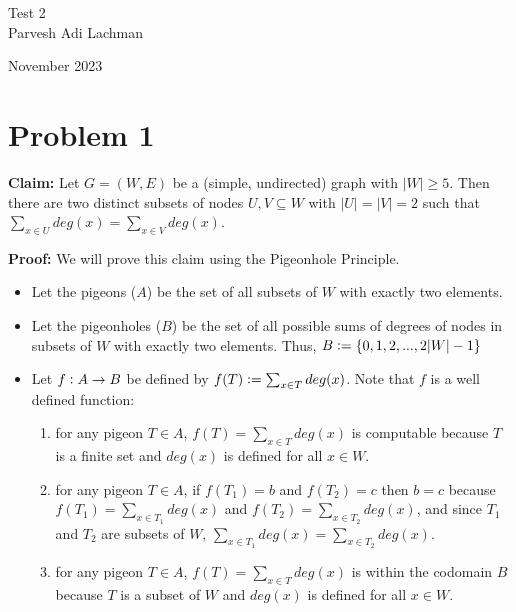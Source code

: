 \documentclass{article}
\begin{document}
\begingroup  
  \centering
  \LARGE Test 2\\[1.25em]
  \large Parvesh Adi Lachman\par\vspace{5pt}
  \large November 2023\par
\endgroup


\section{Problem 1}
\noindent\textbf{Claim:} Let $G=(W,E)$ be a (simple, undirected) graph with $|W|\geq 5$. Then there are two distinct subsets of nodes $U,V\subseteq W$ with $|U| = |V| =2$ such that $\sum_{x\in U} deg(x)=\sum_{x\in V} deg(x)$.\vspace{15pt}

\noindent\textbf{Proof:} We will prove this claim using the Pigeonhole Principle. 

\begin{itemize}
	\item Let the pigeons ($A$) be the set of all subsets of $W$ with exactly two elements.
	\item Let the pigeonholes ($B$) be the set of all possible sums of degrees of nodes in subsets of $W$ with exactly two elements. Thus, $B\vcentcolon =\{0,1,2,...,2|W|-1\}$
	\item Let $f\vcentcolon A\rightarrow B$ be defined by $f(T)\vcentcolon =\sum_{x\in T} deg(x)$. Note that $f$ is a well defined function:
		\begin{enumerate}[(1)]
			\item for any pigeon $T\in A$, $f(T)=\sum_{x\in T} deg(x)$ is computable because $T$ is a finite set and $deg(x)$ is defined for all $x\in W$.
			\item for any pigeon $T\in A$, if $f(T_1)=b$ and $f(T_2)=c$ then $b=c$ because $f(T_1)=\sum_{x\in T_1} deg(x)$ and $f(T_2)=\sum_{x\in T_2} deg(x)$, and since $T_1$ and $T_2$ are subsets of $W$, $\sum_{x\in T_1} deg(x)=\sum_{x\in T_2} deg(x)$. 
			\item for any pigeon $T\in A$, $f(T)=\sum_{x\in T} deg(x)$ is within the codomain $B$ because $T$ is a subset of $W$ and $deg(x)$ is defined for all $x\in W$.
		\end{enumerate}	
\end{itemize}
\end{document}
